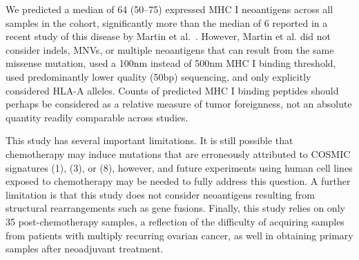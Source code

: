 We predicted a median of 64 (50--75) expressed MHC I neoantigens across all samples in the cohort, significantly more than the median of 6 reported in a recent study of this disease by Martin et al.~\cite{Martin_2016}. However, Martin et al. did not consider indels, MNVs, or multiple neoantigens that can result from the same missense mutation, used a 100nm instead of 500nm MHC I binding threshold, used predominantly lower quality (50bp) sequencing, and only explicitly considered HLA-A alleles. Counts of predicted MHC I binding peptides should perhaps be considered as a relative measure of tumor foreignness, not an absolute quantity readily comparable across studies.




 

This study has several important limitations. It is still possible that chemotherapy may induce mutations that are erroneously attributed to COSMIC signatures (1), (3), or (8), however, and future experiments using human cell lines exposed to chemotherapy may be needed to fully address this question. A further limitation is that this study does not consider neoantigens resulting from structural rearrangements such as gene fusions. Finally, this study relies on only 35 post-chemotherapy samples, a reflection of the difficulty of acquiring samples from patients with multiply recurring ovarian cancer, as well in obtaining primary samples after neoadjuvant treatment.

